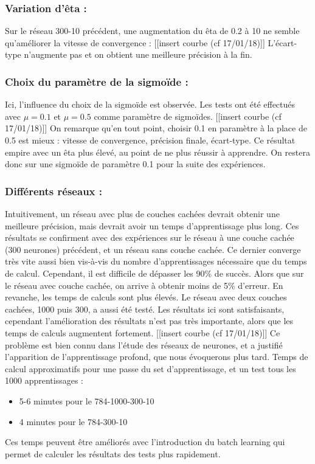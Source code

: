 \subsubsection*{Variation d’êta :}


Sur le réseau 300-10 précédent, une augmentation du êta de 0.2 à 10 ne semble qu’améliorer la vitesse de convergence : [[insert courbe (cf 17/01/18)]]
L’écart-type n’augmente pas et on obtient une meilleure précision à la fin.

\subsubsection*{Choix du paramètre de la sigmoïde :}
Ici, l’influence du choix de la sigmoïde est observée. Les tests ont été effectués avec $\mu = 0.1$ et $\mu = 0.5$ comme paramètre de sigmoïdes.
[[insert courbe (cf 17/01/18)]]
On remarque qu’en tout point, choisir 0.1 en paramètre à la place de 0.5 est mieux : vitesse de convergence, précision finale, écart-type. Ce résultat empire avec un êta plus élevé, au point de ne plus réussir à apprendre. On restera donc sur une sigmoïde de paramètre 0.1 pour la suite des expériences.

\subsubsection*{Différents réseaux :} 
Intuitivement, un réseau avec plus de couches cachées devrait obtenir une meilleure précision, mais devrait avoir un temps d’apprentissage plus long. Ces résultats se confirment avec des expériences sur le réseau à une couche cachée (300 neurones) précédent, et un réseau sans couche cachée. Ce dernier converge très vite aussi bien vis-à-vis du nombre d’apprentissages nécessaire que du temps de calcul. Cependant, il est difficile de dépasser les 90\% de succès. Alors que sur le réseau avec couche cachée, on arrive à obtenir moins de 5\% d’erreur. En revanche, les temps de calculs sont plus élevés. Le réseau avec deux couches cachées, 1000 puis 300, a aussi été testé. Les résultats ici sont satisfaisants, cependant l’amélioration des résultats n’est pas très importante, alors que les temps de calculs augmentent fortement.
[[insert courbe (cf 17/01/18)]]
Ce problème est bien connu dans l'étude des réseaux de neurones, et a justifié l'apparition de l'apprentissage profond, que nous évoquerons plus tard.
Temps de calcul approximatifs pour une passe du set d’apprentissage, et un test tous les 1000 apprentissages :
\begin{itemize}
	\item 5-6 minutes pour le 784-1000-300-10
	\item 4 minutes pour le 784-300-10 
\end{itemize}
Ces temps peuvent être améliorés avec l’introduction du batch learning qui permet de calculer les résultats des tests plus rapidement.